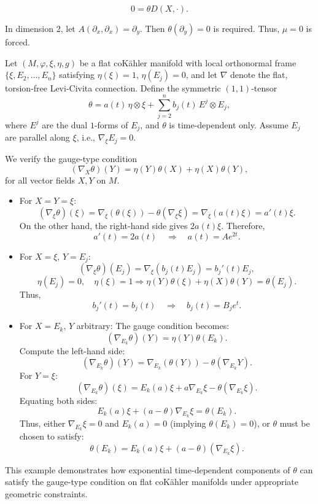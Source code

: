 $$
0 = \theta D(X, \cdot).
$$
\begin{ex}
In dimension 2, let $A(\partial_x, \partial_x) = \partial_y$. Then $\theta(\partial_y) = 0$ is required. Thus, $\mu = 0$ is forced.
\end{ex}
\begin{ex}
Let $(M, \varphi, \xi, \eta, g)$ be a flat coKähler manifold with local orthonormal frame $\{\xi, E_2, \ldots, E_n\}$ satisfying $\eta(\xi) = 1$, $\eta(E_j) = 0$, and let $\nabla$ denote the flat, torsion-free Levi-Civita connection. Define the symmetric $(1,1)$-tensor
\[
\theta = a(t)\, \eta \otimes \xi + \sum_{j=2}^n b_j(t)\, E^j \otimes E_j,
\]
where $E^j$ are the dual $1$-forms of $E_j$, and $\theta$ is time-dependent only. Assume $E_j$ are parallel along $\xi$, i.e., $\nabla_\xi E_j = 0$.

We verify the gauge-type condition
\[
(\nabla_X \theta)(Y) = \eta(Y)\theta(X) + \eta(X)\theta(Y),
\]
for all vector fields $X, Y$ on $M$.

\begin{itemize}
\item For $X = Y = \xi$:
\[
(\nabla_\xi \theta)(\xi) = \nabla_\xi(\theta(\xi)) - \theta(\nabla_\xi \xi) = \nabla_\xi(a(t)\xi) = a'(t)\xi.
\]
On the other hand, the right-hand side gives $2a(t)\xi$. Therefore,
\[
a'(t) = 2a(t) \quad \Rightarrow \quad a(t) = A e^{2t}.
\]

\item For $X = \xi$, $Y = E_j$:
\[
(\nabla_\xi \theta)(E_j) = \nabla_\xi(b_j(t) E_j) = b_j'(t) E_j,
\]
\[
\eta(E_j) = 0, \quad \eta(\xi) = 1 \Rightarrow \eta(Y)\theta(\xi) + \eta(X)\theta(Y) = \theta(E_j).
\]
Thus,
\[
b_j'(t) = b_j(t) \quad \Rightarrow \quad b_j(t) = B_j e^t.
\]

\item For $X = E_k$, $Y$ arbitrary:
The gauge condition becomes:
\[
(\nabla_{E_k} \theta)(Y) = \eta(Y)\theta(E_k).
\]
Compute the left-hand side:
\[
(\nabla_{E_k} \theta)(Y) = \nabla_{E_k}(\theta(Y)) - \theta(\nabla_{E_k} Y).
\]
For $Y = \xi$:
\[
(\nabla_{E_k} \theta)(\xi) = E_k(a)\xi + a \nabla_{E_k} \xi - \theta(\nabla_{E_k} \xi).
\]
Equating both sides:
\[
E_k(a)\xi + (a - \theta)\nabla_{E_k} \xi = \theta(E_k).
\]
Thus, either $\nabla_{E_k} \xi = 0$ and $E_k(a) = 0$ (implying $\theta(E_k) = 0$), or $\theta$ must be chosen to satisfy:
\[
\theta(E_k) = E_k(a)\xi + (a - \theta)(\nabla_{E_k} \xi).
\]
\end{itemize}

This example demonstrates how exponential time-dependent components of $\theta$ can satisfy the gauge-type condition on flat coKähler manifolds under appropriate geometric constraints.
\end{ex}
